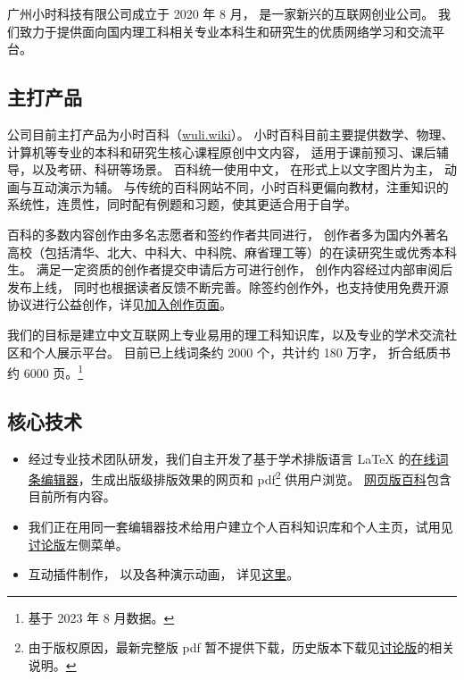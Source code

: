
广州小时科技有限公司成立于 2020 年 8 月， 是一家新兴的互联网创业公司。 我们致力于提供面向国内理工科相关专业本科生和研究生的优质网络学习和交流平台。


\subsection{主打产品}
公司目前主打产品为小时百科（\href{https://wuli.wiki}{wuli.wiki}）。 小时百科目前主要提供数学、物理、计算机等专业的本科和研究生核心课程原创中文内容， 适用于课前预习、课后辅导，以及考研、科研等场景。 百科统一使用中文， 在形式上以文字图片为主， 动画与互动演示为辅。 与传统的百科网站不同，小时百科更偏向教材，注重知识的系统性，连贯性，同时配有例题和习题，使其更适合用于自学。

百科的多数内容创作由多名志愿者和签约作者共同进行， 创作者多为国内外著名高校（包括清华、北大、中科大、中科院、麻省理工等）的在读研究生或优秀本科生。 满足一定资质的创作者提交申请后方可进行创作， 创作内容经过内部审阅后发布上线， 同时也根据读者反馈不断完善。除签约创作外，也支持使用免费开源协议进行公益创作，详见\href{https://wuli.wiki/forum/f9ec7f8e-ca37-4278-a77e-ba5c0e40e115}{加入创作页面}。

我们的目标是建立中文互联网上专业易用的理工科知识库，以及专业的学术交流社区和个人展示平台。 目前已上线词条约 2000 个，共计约 180 万字， 折合纸质书约 6000 页。\footnote{基于 2023 年 8 月数据。}

\subsection{核心技术}
\begin{itemize}
\item 经过专业技术团队研发，我们自主开发了基于学术排版语言 LaTeX 的\href{https://wuli.wiki/editor/}{在线词条编辑器}，生成出版级排版效果的网页和 pdf\footnote{由于版权原因，最新完整版 pdf 暂不提供下载，历史版本下载见\href{https://wuli.wiki/forum/}{讨论版}的相关说明。} 供用户浏览。 \href{https://wuli.wiki/online/}{网页版百科}包含目前所有内容。
\item 我们正在用同一套编辑器技术给用户建立个人百科知识库和个人主页，试用见\href{https://wuli.wiki/forum/}{讨论版}左侧菜单。
\item 互动插件制作， 以及各种演示动画， 详见\href{http://wuli.wiki/apps}{这里}。
\end{itemize}
